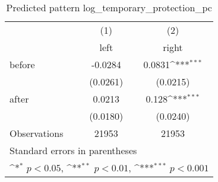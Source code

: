 \begin{table}[htbp]\centering
\def\sym#1{\ifmmode^{#1}\else\(^{#1}\)\fi}
\caption{Predicted pattern log\_temporary\_protection\_pc}
\begin{tabular}{l*{2}{c}}
\hline\hline
                    &\multicolumn{1}{c}{(1)}&\multicolumn{1}{c}{(2)}\\
                    &\multicolumn{1}{c}{left}&\multicolumn{1}{c}{right}\\
\hline
before              &     -0.0284         &      0.0831\sym{***}\\
                    &    (0.0261)         &    (0.0215)         \\
[1em]
after               &      0.0213         &       0.128\sym{***}\\
                    &    (0.0180)         &    (0.0240)         \\
\hline
Observations        &       21953         &       21953         \\
\hline\hline
\multicolumn{3}{l}{\footnotesize Standard errors in parentheses}\\
\multicolumn{3}{l}{\footnotesize \sym{*} \(p<0.05\), \sym{**} \(p<0.01\), \sym{***} \(p<0.001\)}\\
\end{tabular}
\end{table}
